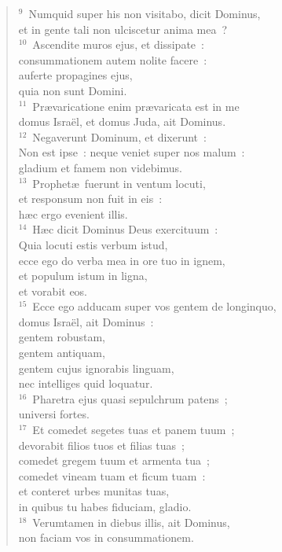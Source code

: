 \begin{verse}
${}^{9}$~Numquid super his non visitabo, dicit Dominus,\\ et in gente tali non ulciscetur anima mea~?\\
${}^{10}$~Ascendite muros ejus, et dissipate~:\\ consummationem autem nolite facere~:\\ auferte propagines ejus,\\ quia non sunt Domini.\\
${}^{11}$~Pr\ae varicatione enim pr\ae varicata est in me\\ domus Isra\"el, et domus Juda, ait Dominus.\\
${}^{12}$~Negaverunt Dominum, et dixerunt~:\\ Non est ipse~: neque veniet super nos malum~:\\ gladium et famem non videbimus.\\
${}^{13}$~Prophet\ae\ fuerunt in ventum locuti,\\ et responsum non fuit in eis~:\\ h\ae c ergo evenient illis.\\
${}^{14}$~H\ae c dicit Dominus Deus exercituum~:\\ Quia locuti estis verbum istud,\\ ecce ego do verba mea in ore tuo in ignem,\\ et populum istum in ligna,\\ et vorabit eos.\\
${}^{15}$~Ecce ego adducam super vos gentem de longinquo,\\ domus Isra\"el, ait Dominus~:\\ gentem robustam,\\ gentem antiquam,\\ gentem cujus ignorabis linguam,\\ nec intelliges quid loquatur.\\
${}^{16}$~Pharetra ejus quasi sepulchrum patens~;\\ universi fortes.\\
${}^{17}$~Et comedet segetes tuas et panem tuum~;\\ devorabit filios tuos et filias tuas~;\\ comedet gregem tuum et armenta tua~;\\ comedet vineam tuam et ficum tuam~:\\ et conteret urbes munitas tuas,\\ in quibus tu habes fiduciam, gladio.\\
${}^{18}$~Verumtamen in diebus illis, ait Dominus,\\ non faciam vos in consummationem.\\

\end{verse}

